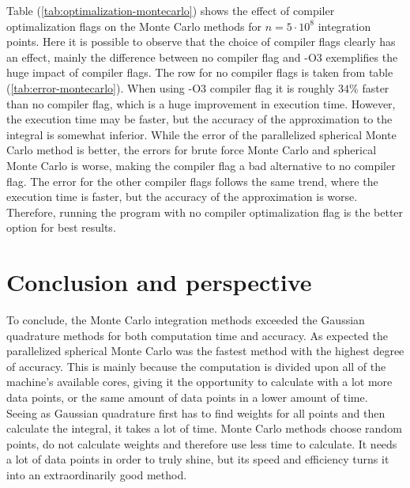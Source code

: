 \documentclass{article}
\begin{document}
Table (\ref{tab:optimalization-montecarlo}) shows the effect of compiler optimalization flags on the Monte Carlo methods for $n = 5 \cdot 10^8$ integration points. Here it is possible to observe that the choice of compiler flags clearly has an effect, mainly the difference between no compiler flag and -O3 exemplifies the huge impact of compiler flags. The row for no compiler flags is taken from table (\ref{tab:error-montecarlo}). When using -O3 compiler flag it is roughly $34 \%$ faster than no compiler flag, which is a huge improvement in execution time. However, the execution time may be faster, but the accuracy of the approximation to the integral is somewhat inferior. While the error of the parallelized spherical Monte Carlo method is better, the errors for brute force Monte Carlo and spherical Monte Carlo is worse, making the compiler flag a bad alternative to no compiler flag. The error for the other compiler flags follows the same trend, where the execution time is faster, but the accuracy of the approximation is worse. Therefore, running the program with no compiler optimalization flag is the better option for best results.


\vspace{1cm}

\section{Conclusion and perspective} \label{sec:Conclusion}

To conclude, the Monte Carlo integration methods exceeded the Gaussian quadrature methods for both computation time and accuracy. As expected the parallelized spherical Monte Carlo was the fastest method with the highest degree of accuracy. This is mainly because the computation is divided upon all of the machine's available cores, giving it the opportunity to calculate with a lot more data points, or the same amount of data points in a lower amount of time. \\

Seeing as Gaussian quadrature first has to find weights for all points and then calculate the integral, it takes a lot of time. Monte Carlo methods choose random points, do not calculate weights and therefore use less time to calculate. It needs a lot of data points in order to truly shine, but its speed and efficiency turns it into an extraordinarily good method.

\vspace{1cm}
\end{document}
